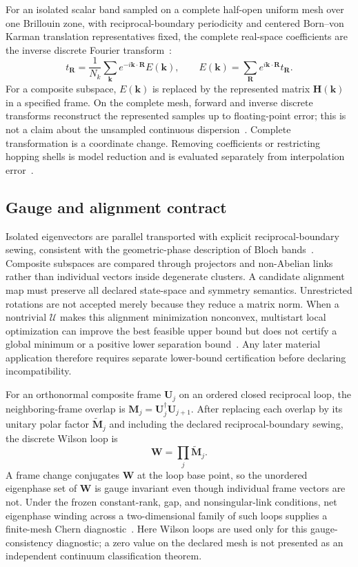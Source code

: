 \documentclass[preprint,12pt]{elsarticle}
\begin{document}
For an isolated scalar band sampled on a complete half-open uniform mesh over
one Brillouin zone, with reciprocal-boundary periodicity and centered
Born--von Karman translation representatives fixed, the complete real-space
coefficients are the inverse discrete Fourier transform~\cite{trefethen2000}:
\begin{equation}
 t_{\bm{R}}
 =\frac{1}{N_k}\sum_{\bm{k}}
 e^{-i\bm{k}\cdot\bm{R}}E(\bm{k}),
 \qquad
 E(\bm{k})=\sum_{\bm{R}}e^{i\bm{k}\cdot\bm{R}}t_{\bm{R}}.
 \label{eq:complete-transform}
\end{equation}
For a composite subspace, $E(\bm{k})$ is replaced by the represented matrix
$\bm{H}(\bm{k})$ in a specified frame. On the complete mesh, forward and
inverse discrete transforms reconstruct the represented samples up to
floating-point error; this is not a claim about the unsampled continuous
dispersion~\cite{trefethen2000,higham2002}. Complete transformation is a
coordinate change. Removing coefficients or restricting hopping shells is
model reduction and is evaluated separately from interpolation
error~\cite{pizzi2020,yates2007}.

\subsection{Gauge and alignment contract}
\label{sec:gauge-alignment}

Isolated eigenvectors are parallel transported with explicit
reciprocal-boundary sewing, consistent with the geometric-phase description of
Bloch bands~\cite{resta1994,zak1989}. Composite subspaces are compared through
projectors and non-Abelian links rather than individual vectors inside
degenerate clusters. A candidate alignment map must preserve all declared
state-space and symmetry semantics. Unrestricted rotations are not accepted
merely because they reduce a matrix norm. When a nontrivial $\mathcal{U}$ makes
this alignment minimization nonconvex, multistart local optimization can improve
the best feasible upper bound but does not certify a global minimum or a
positive lower separation bound~\cite{nocedal2006}. Any later material
application therefore requires separate lower-bound certification before
declaring incompatibility.

For an orthonormal composite frame $\bm{U}_j$ on an ordered closed reciprocal
loop, the neighboring-frame overlap is
$\bm{M}_j=\bm{U}_j^\dagger\bm{U}_{j+1}$. After replacing each overlap by its
unitary polar factor $\widetilde{\bm{M}}_j$ and including the declared
reciprocal-boundary sewing, the discrete Wilson loop is
\[
 \bm{W}=\prod_j\widetilde{\bm{M}}_j.
\]
A frame change conjugates $\bm{W}$ at the loop base point, so the unordered
eigenphase set of $\bm{W}$ is gauge invariant even though individual frame
vectors are not. Under the frozen constant-rank, gap, and nonsingular-link
conditions, net eigenphase winding across a two-dimensional family of such
loops supplies a finite-mesh Chern diagnostic~\cite{resta1994,zak1989,thouless1982,niu1985}.
Here Wilson loops are used only for this gauge-consistency diagnostic; a zero
value on the declared mesh is not presented as an independent continuum
classification theorem.
\end{document}
